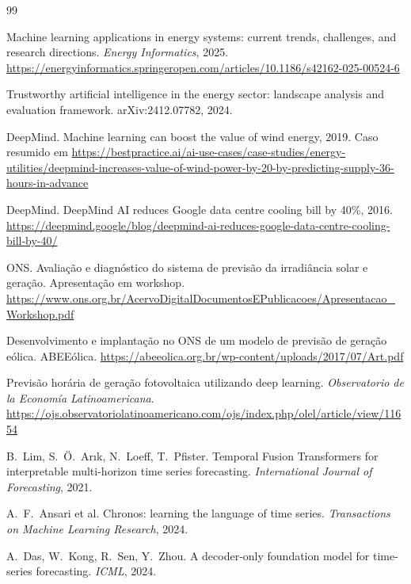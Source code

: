 \documentclass[11pt,a4paper]{article}
\begin{document}
\begin{thebibliography}{99}
\small

Machine learning applications in energy systems: current trends, challenges,
and research directions. \textit{Energy Informatics}, 2025.
\url{https://energyinformatics.springeropen.com/articles/10.1186/s42162-025-00524-6}

Trustworthy artificial intelligence in the energy sector: landscape analysis
and evaluation framework. arXiv:2412.07782, 2024.

DeepMind. Machine learning can boost the value of wind energy, 2019. Caso
resumido em
\url{https://bestpractice.ai/ai-use-cases/case-studies/energy-utilities/deepmind-increases-value-of-wind-power-by-20-by-predicting-supply-36-hours-in-advance}

DeepMind. DeepMind AI reduces Google data centre cooling bill by 40\%, 2016.
\url{https://deepmind.google/blog/deepmind-ai-reduces-google-data-centre-cooling-bill-by-40/}

ONS. Avaliação e diagnóstico do sistema de previsão da irradiância solar e
geração. Apresentação em workshop.
\url{https://www.ons.org.br/AcervoDigitalDocumentosEPublicacoes/Apresentacao_Workshop.pdf}

Desenvolvimento e implantação no ONS de um modelo de previsão de geração
eólica. ABEEólica.
\url{https://abeeolica.org.br/wp-content/uploads/2017/07/Art.pdf}

Previsão horária de geração fotovoltaica utilizando deep learning.
\textit{Observatorio de la Economía Latinoamericana}.
\url{https://ojs.observatoriolatinoamericano.com/ojs/index.php/olel/article/view/11654}

B.~Lim, S.~Ö.~Arık, N.~Loeff, T.~Pfister. Temporal Fusion Transformers for
interpretable multi-horizon time series forecasting. \textit{International
Journal of Forecasting}, 2021.

A.~F.~Ansari et al. Chronos: learning the language of time series.
\textit{Transactions on Machine Learning Research}, 2024.

A.~Das, W.~Kong, R.~Sen, Y.~Zhou. A decoder-only foundation model for
time-series forecasting. \textit{ICML}, 2024.


\end{thebibliography}
\end{document}
